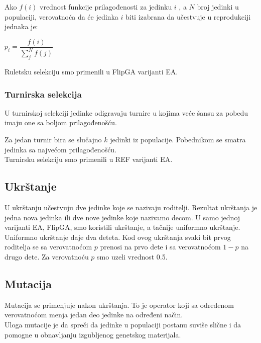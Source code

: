 \documentclass{article}
\begin{document}
Ako $f(i)$ vrednost funkcije prilagođenosti za jedinku $i$ , a $N$ broj jedinki u populaciji, verovatnoća da će jedinka $i$ biti izabrana da učestvuje u reprodukciji jednaka je:\\

\begin{center}
$p_i = \dfrac{f(i)}{\sum_{j}^{N} f(j)} $
\end{center}

Ruletsku selekciju smo primenili u FlipGA varijanti EA.

\subsubsection{Turnirska selekcija}
\label{sec:ea_turnirska}
U turnirskoj selekciji \cite{vi_Janicic} jedinke odigravaju turnire u kojima veće šansu za pobedu imaju one sa boljom prilagođenošću.\

Za jedan turnir bira se slučajno $k$ jedinki iz populacije. Pobednikom se smatra jedinka sa najvećom prilagođenošću.\\

Turnirsku selekciju smo primenili u REF varijanti EA.

\subsection{Ukrštanje}
 \label{sec:ea_ukrstanje}
U ukrštanju \cite{vi_Janicic} učestvuju dve jedinke koje se nazivaju roditelji. Rezultat ukrštanja je jedna nova jedinka ili dve nove jedinke koje nazivamo decom. U samo jednoj varijanti EA, FlipGA, smo koristili ukrštanje, a tačnije uniformno ukrštanje. \\

Uniformno ukrštanje daje dva deteta. Kod ovog ukrštanja svaki bit prvog roditelja se sa verovatnoćom $p$ prenosi na prvo dete i sa verovatnoćom $1-p$ na drugo dete. 	Za verovatnoću $p$ smo uzeli vrednost 0.5. 

\subsection{Mutacija}
 \label{sec:ea_mutacija}
Mutacija \cite{vi_Janicic} se primenjuje nakon ukrštanja. To je operator koji sa određenom verovatnoćom menja jedan deo jedinke na određeni način.\\

Uloga mutacije je da spreči da jedinke u populaciji postanu suviše slične i da pomogne u obnavljanju izgubljenog genetskog materijala. 
\end{document}
